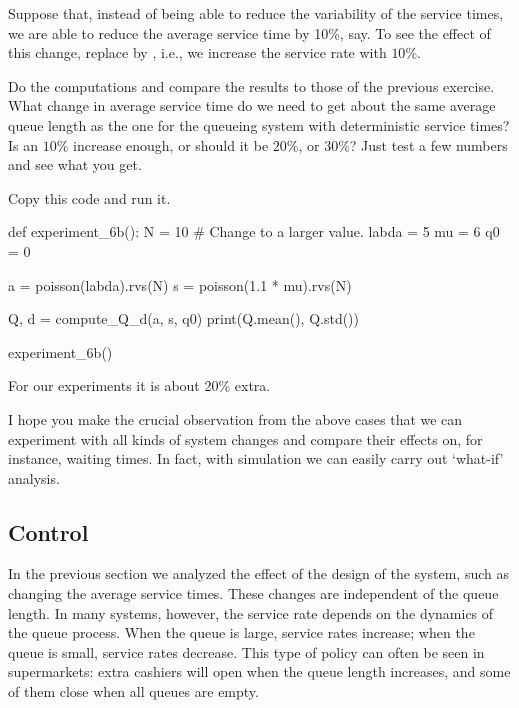 \begin{exercise}
  Suppose that, instead of being able to reduce the variability of the service times, we are able to reduce the average service time by 10\%, say. 
  To see the effect of this change, replace  by , i.e., we increase the service rate with $10\%$.

Do the computations and compare the results to those of the previous exercise. What change in average service time do we need to get about the same average queue length as the one for the queueing system with deterministic service times? Is an $10\%$ increase enough, or should it be $20\%$, or $30\%$? Just test a few numbers and see what you get.
\begin{solution}
Copy this code and run it.

\begin{pyverbatim}
def experiment_6b():
    N = 10  # Change to a larger value.
    labda = 5
    mu = 6
    q0 = 0

    a = poisson(labda).rvs(N)
    s = poisson(1.1 * mu).rvs(N)

    Q, d = compute_Q_d(a, s, q0)
    print(Q.mean(), Q.std())


experiment_6b()
\end{pyverbatim}
For our experiments it is about 20\% extra.
  \end{solution}
\end{exercise}

I hope you make the crucial observation from the above cases that we can experiment with all kinds of system changes and compare their effects on, for instance, waiting times.
In fact, with simulation we can easily carry out `what-if' analysis.

\subsection{Control}
\label{sec:control-}

In the previous section we analyzed the effect of the design of the system, such as changing the average service times.
These changes are independent of the queue length.
In many systems, however, the service rate depends on the dynamics of the queue process.
When the queue is large, service rates increase; when the queue is small, service rates decrease.
This type of policy can often be seen in supermarkets: extra cashiers will open when the queue length increases, and some of them close when all queues are empty.

